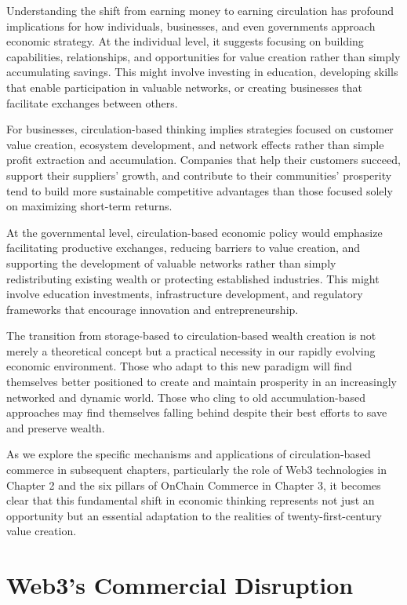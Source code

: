 \documentclass[
  Letterpaper,
]{scrbook}
\begin{document}
Understanding the shift from earning money to earning circulation has
profound implications for how individuals, businesses, and even
governments approach economic strategy. At the individual level, it
suggests focusing on building capabilities, relationships, and
opportunities for value creation rather than simply accumulating
savings. This might involve investing in education, developing skills
that enable participation in valuable networks, or creating businesses
that facilitate exchanges between others.

For businesses, circulation-based thinking implies strategies focused on
customer value creation, ecosystem development, and network effects
rather than simple profit extraction and accumulation. Companies that
help their customers succeed, support their suppliers' growth, and
contribute to their communities' prosperity tend to build more
sustainable competitive advantages than those focused solely on
maximizing short-term returns.

At the governmental level, circulation-based economic policy would
emphasize facilitating productive exchanges, reducing barriers to value
creation, and supporting the development of valuable networks rather
than simply redistributing existing wealth or protecting established
industries. This might involve education investments, infrastructure
development, and regulatory frameworks that encourage innovation and
entrepreneurship.

The transition from storage-based to circulation-based wealth creation
is not merely a theoretical concept but a practical necessity in our
rapidly evolving economic environment. Those who adapt to this new
paradigm will find themselves better positioned to create and maintain
prosperity in an increasingly networked and dynamic world. Those who
cling to old accumulation-based approaches may find themselves falling
behind despite their best efforts to save and preserve wealth.

As we explore the specific mechanisms and applications of
circulation-based commerce in subsequent chapters, particularly the role
of Web3 technologies in Chapter 2 and the six pillars of OnChain
Commerce in Chapter 3, it becomes clear that this fundamental shift in
economic thinking represents not just an opportunity but an essential
adaptation to the realities of twenty-first-century value creation.

\chapter{Web3's Commercial Disruption}\label{sec-web3-disruption}
\end{document}
